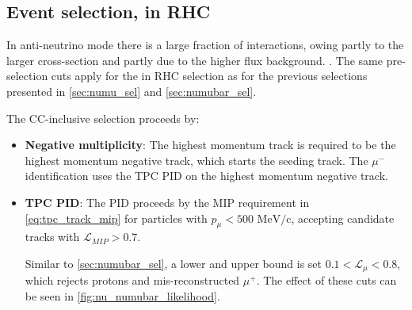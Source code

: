 \subsection{Event selection, \numu in RHC}
\label{sec:numu_in_nubar_sel}
In anti-neutrino mode there is a large fraction of \numu interactions, owing partly to the larger \numu cross-section and partly due to the higher flux background. . The same pre-selection cuts apply for the \numu in RHC selection as for the previous selections presented in \autoref{sec:numu_sel} and \autoref{sec:numubar_sel}.

The CC-inclusive selection proceeds by:
\begin{itemize}
	\item \textbf{Negative multiplicity}: The highest momentum track is required to be the highest momentum negative track, which starts the seeding track. The $\mu^-$ identification uses the TPC PID on the highest momentum negative track. 
	
	\item \textbf{TPC PID}: The PID proceeds by the MIP requirement in \autoref{eq:tpc_track_mip} for particles with $p_\mu < 500 \text{ MeV/c}$, accepting candidate tracks with $\mathcal{L}_{MIP} > 0.7$.
	
	Similar to \autoref{sec:numubar_sel}, a lower and upper bound is set $0.1 < \mathcal{L}_\mu < 0.8$, which rejects protons and mis-reconstructed $\mu^+$. The effect of these cuts can be seen in \autoref{fig:nu_numubar_likelihood}.
\end{itemize}

